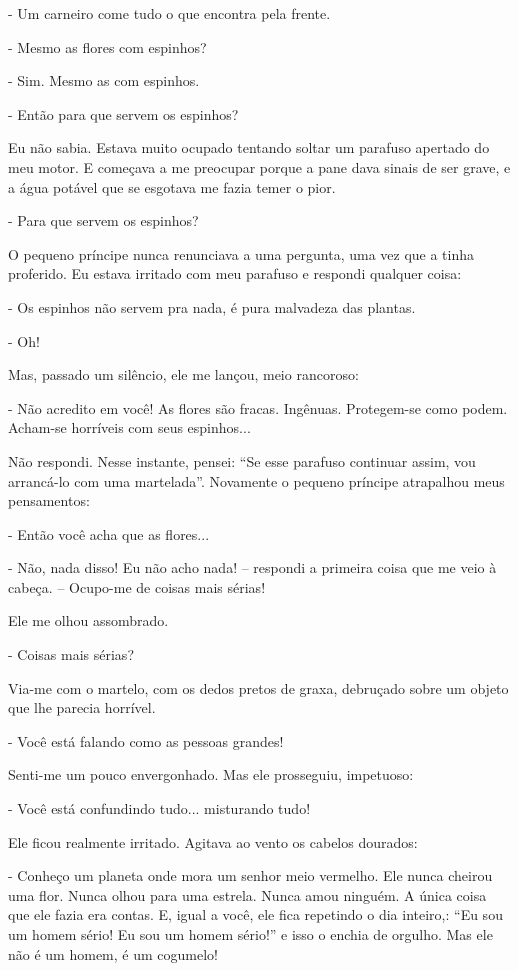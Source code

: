 \begin{Parallel}[p]{}{}
{- Um carneiro come tudo o que encontra pela frente.

- Mesmo as flores com espinhos?

- Sim. Mesmo as com espinhos.

- Então para que servem os espinhos?

Eu não sabia. Estava muito ocupado tentando soltar um parafuso apertado
do meu motor. E começava a me preocupar porque a pane dava sinais de ser
grave, e a água potável que se esgotava me fazia temer o pior.

- Para que servem os espinhos?

O pequeno príncipe nunca renunciava a uma pergunta, uma vez que a tinha
proferido. Eu estava irritado com meu parafuso e respondi qualquer
coisa:

- Os espinhos não servem pra nada, é pura malvadeza das plantas.

- Oh!

Mas, passado um silêncio, ele me lançou, meio rancoroso:

- Não acredito em você! As flores são fracas. Ingênuas. Protegem-se como
podem. Acham-se horríveis com seus espinhos...

Não respondi. Nesse instante, pensei: ``Se esse parafuso continuar
assim, vou arrancá-lo com uma martelada''. Novamente o pequeno príncipe
atrapalhou meus pensamentos:

- Então você acha que as flores...

- Não, nada disso! Eu não acho nada! -- respondi a primeira coisa que me
veio à cabeça. -- Ocupo-me de coisas mais sérias!

Ele me olhou assombrado.

- Coisas mais sérias?

Via-me com o martelo, com os dedos pretos de graxa, debruçado sobre um
objeto que lhe parecia horrível.

- Você está falando como as pessoas grandes!

Senti-me um pouco envergonhado. Mas ele prosseguiu, impetuoso:

- Você está confundindo tudo... misturando tudo!

Ele ficou realmente irritado. Agitava ao vento os cabelos dourados:

- Conheço um planeta onde mora um senhor meio vermelho. Ele nunca
cheirou uma flor. Nunca olhou para uma estrela. Nunca amou ninguém. A
única coisa que ele fazia era contas. E, igual a você, ele fica
repetindo o dia inteiro,: ``Eu sou um homem sério! Eu sou um homem
sério!'' e isso o enchia de orgulho. Mas ele não é um homem, é um
cogumelo!

}
\end{Parallel}
